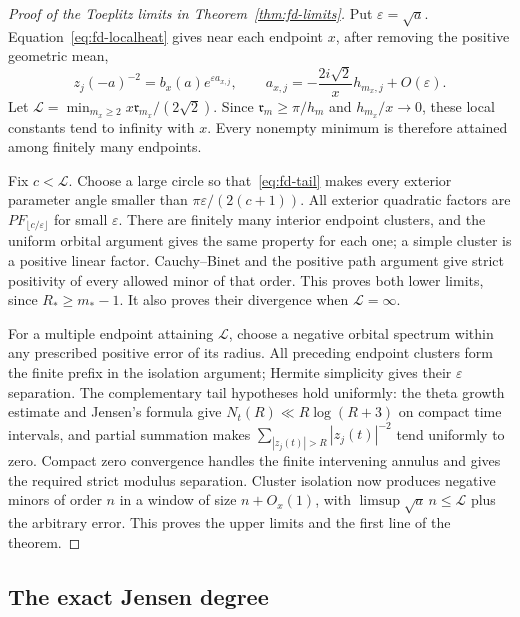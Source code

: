 \begin{proof}[Proof of the Toeplitz limits in Theorem~\ref{thm:fd-limits}]
Put $\varepsilon=\sqrt a$.  Equation~\eqref{eq:fd-localheat} gives
near each endpoint $x$, after removing the positive geometric mean,
\[
 z_j(-a)^{-2}=b_x(a)e^{\varepsilon a_{x,j}},\qquad
 a_{x,j}=-\frac{2i\sqrt2}{x}h_{m_x,j}+O(\varepsilon).
\]
Let $\mathcal L=\min_{m_x\ge2}x\mathfrak r_{m_x}/(2\sqrt2)$.
Since $\mathfrak r_m\ge\pi/h_m$ and $h_{m_x}/x\to0$, these
local constants tend to infinity with $x$.  Every nonempty minimum
is therefore attained among finitely many endpoints.

Fix $c<\mathcal L$.  Choose a large circle so that~\eqref{eq:fd-tail}
makes every exterior parameter angle smaller than
$\pi\varepsilon/(2(c+1))$.  All exterior quadratic factors are
$PF_{\lfloor c/\varepsilon\rfloor}$ for small $\varepsilon$.
There are finitely many interior endpoint clusters, and the uniform
orbital argument gives the same property for each one; a simple
cluster is a positive linear factor.  Cauchy--Binet and the positive
path argument give strict positivity of every allowed minor of that
order.  This proves both lower limits, since $R_*\ge m_*-1$.
It also proves their divergence when $\mathcal L=\infty$.

For a multiple endpoint attaining $\mathcal L$, choose a negative
orbital spectrum within any prescribed positive error of its radius.
All preceding endpoint clusters form the finite prefix in the
isolation argument; Hermite simplicity gives their
$\varepsilon$ separation.  The complementary tail hypotheses hold
uniformly: the theta growth estimate and Jensen's formula give
$N_t(R)\ll R\log(R+3)$ on compact time intervals, and partial
summation makes $\sum_{|z_j(t)|>R}|z_j(t)|^{-2}$ tend uniformly
to zero.  Compact zero convergence handles the finite intervening
annulus and gives the required strict modulus separation.
Cluster isolation now produces negative minors of order $n$ in a
window of size $n+O_x(1)$, with
$\limsup\sqrt a\,n\le\mathcal L$ plus the arbitrary error.
This proves the upper limits and the first line of the theorem.
\end{proof}

\subsection{The exact Jensen degree}

